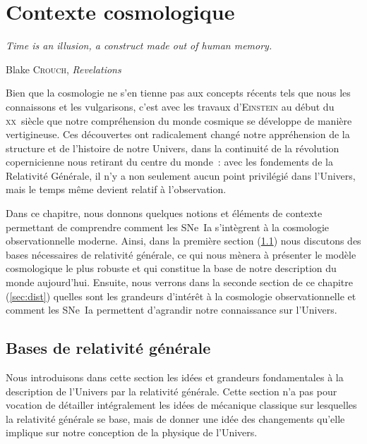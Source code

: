 \documentclass[../main/main.tex]{subfiles}
\begin{document}
\mainmatter


\chapter{Contexte cosmologique}\label{ch:cosmo}

\epigraph{\openquote\textit{Time is an illusion, a construct made out of human
memory.}\closequote}{Blake \textsc{Crouch}, \textit{Revelations}}

Bien que la cosmologie ne s'en tienne pas aux concepts récents tels que nous les
connaissons et les vulgarisons, c'est avec les travaux d'\textsc{Einstein} au
début du \textsc{xx}\ieme~siècle que notre compréhension du monde cosmique se
développe de manière vertigineuse. Ces découvertes ont radicalement changé notre
appréhension de la structure et de l'histoire de notre Univers, dans la
continuité de la révolution copernicienne nous retirant du centre du monde~:
avec les fondements de la Relativité Générale, il n'y a non seulement aucun
point privilégié dans l'Univers, mais le temps même devient relatif à
l'observation.

Dans ce chapitre, nous donnons quelques notions et éléments de contexte
permettant de comprendre comment les SNe~Ia s'intègrent à la cosmologie
observationnelle moderne. Ainsi, dans la première section (\ref{sec:bases}) nous
discutons des bases nécessaires de relativité générale, ce qui nous mènera à
présenter le modèle cosmologique le plus robuste et qui constitue la base de
notre description du monde aujourd'hui. Ensuite, nous verrons dans la seconde
section de ce chapitre (\ref{sec:dist}) quelles sont les grandeurs d'intérêt à
la cosmologie observationnelle et comment les SNe~Ia permettent d'agrandir notre
connaissance sur l'Univers.

\vfill
\minitoc
\vfill

\newpage

\thispagestyle{plain}
\vspace*{\fill}
\minilof
\vspace*{\fill}

\newpage

\section{Bases de relativité générale}\label{sec:bases}

Nous introduisons dans cette section les idées et grandeurs fondamentales à la
description de l'Univers par la relativité générale. Cette section n'a pas pour
vocation de détailler intégralement les idées de mécanique classique sur
lesquelles la relativité générale se base, mais de donner une idée des
changements qu'elle implique sur notre conception de la physique de l'Univers.
\end{document}
